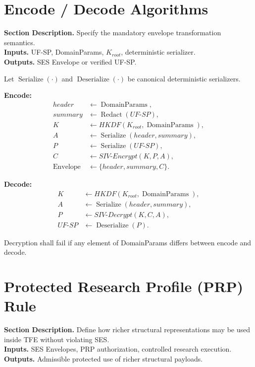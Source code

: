 \documentclass[11pt]{report}
\newcommand{\meta}[3]{\textbf{Section Description.} #1\\
\textbf{Inputs.} #2\\
\textbf{Outputs.} #3\par}
\begin{document}
\section{Encode / Decode Algorithms}
\meta{Specify the mandatory envelope transformation semantics.}{UF-SP, DomainParams, $K_{root}$, deterministic serializer.}{SES Envelope or verified UF-SP.}

Let $\operatorname{Serialize}(\cdot)$ and $\operatorname{Deserialize}(\cdot)$ be canonical deterministic serializers.

\textbf{Encode:}
\begin{align*}
header &\leftarrow \operatorname{DomainParams},\\
summary &\leftarrow \operatorname{Redact}(UF\mbox{-}SP),\\
K &\leftarrow HKDF(K_{root},\operatorname{DomainParams}),\\
A &\leftarrow \operatorname{Serialize}(header,summary),\\
P &\leftarrow \operatorname{Serialize}(UF\mbox{-}SP),\\
C &\leftarrow SIV\mbox{-}Encrypt(K,P,A),\\
\operatorname{Envelope} &\leftarrow \{header,summary,C\}.
\end{align*}

\textbf{Decode:}
\begin{align*}
K &\leftarrow HKDF(K_{root},\operatorname{DomainParams}),\\
A &\leftarrow \operatorname{Serialize}(header,summary),\\
P &\leftarrow SIV\mbox{-}Decrypt(K,C,A),\\
UF\mbox{-}SP &\leftarrow \operatorname{Deserialize}(P).
\end{align*}

Decryption shall fail if any element of DomainParams differs between encode and decode.

\section{Protected Research Profile (PRP) Rule}
\meta{Define how richer structural representations may be used inside TFE without violating SES.}{SES Envelopes, PRP authorization, controlled research execution.}{Admissible protected use of richer structural payloads.}
\end{document}
